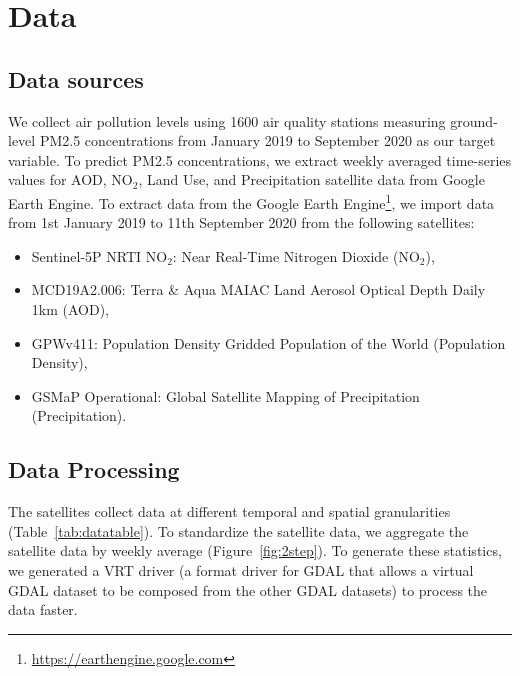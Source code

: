 \section{Data}\label{sec:data}

\subsection{Data sources}
We collect air pollution levels using 1600 air quality stations measuring ground-level PM2.5 concentrations from January 2019 to September 2020 as our target variable. To predict PM2.5 concentrations, we extract weekly averaged time-series values for AOD, NO$_2$, Land Use, and Precipitation satellite data from Google Earth Engine. To extract data from the Google Earth Engine\footnote{\url{https://earthengine.google.com}}, we import data from 1st January 2019 to 11th September 2020 from the following satellites:
%
\begin{itemize}
    \item Sentinel-5P NRTI NO$_2$: Near Real-Time Nitrogen Dioxide (NO$_2$),
    \item MCD19A2.006: Terra \& Aqua MAIAC Land Aerosol Optical Depth Daily 1km (AOD),
    \item GPWv411: Population Density Gridded Population of the World (Population Density),
    \item GSMaP Operational: Global Satellite Mapping of Precipitation (Precipitation).
\end{itemize}

\subsection{Data Processing}
The satellites collect data at different temporal and spatial granularities (Table~\ref{tab:datatable}). To standardize the satellite data, we aggregate the satellite data by weekly average (Figure~\ref{fig:2step}). To generate these statistics, we generated a VRT driver (a format driver for GDAL that allows a virtual GDAL dataset to be composed from the other GDAL datasets) to process the data faster.

